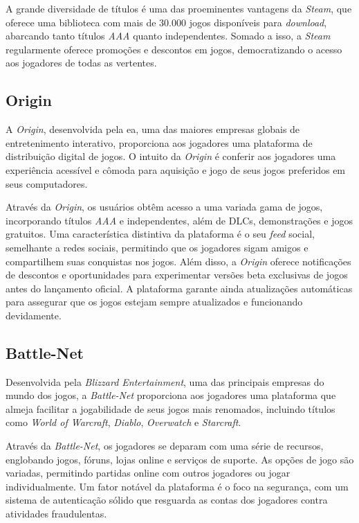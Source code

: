 A grande diversidade de títulos é uma das proeminentes vantagens da \textit{\gls{Steam}}, que oferece uma biblioteca com mais de 30.000 jogos disponíveis para \textit{download}, abarcando tanto títulos \textit{\gls{AAA}} quanto independentes. Somado a isso, a \textit{\gls{Steam}} regularmente oferece promoções e descontos em jogos, democratizando o acesso aos jogadores de todas as vertentes.

\subsection{Origin}

A \textit{\gls{Origin}}, desenvolvida pela \ac{ea}, uma das maiores empresas globais de entretenimento interativo, proporciona aos jogadores uma plataforma de distribuição digital de jogos. O intuito da \textit{\gls{Origin}} é conferir aos jogadores uma experiência acessível e cômoda para aquisição e jogo de seus jogos preferidos em seus computadores.

Através da \textit{\gls{Origin}}, os usuários obtêm acesso a uma variada gama de jogos, incorporando títulos \textit{\gls{AAA}} e independentes, além de DLCs, demonstrações e jogos gratuitos. Uma característica distintiva da plataforma é o seu \textit{feed} social, semelhante a redes sociais, permitindo que os jogadores sigam amigos e compartilhem suas conquistas nos jogos. Além disso, a \textit{\gls{Origin}} oferece notificações de descontos e oportunidades para experimentar versões beta exclusivas de jogos antes do lançamento oficial. A plataforma garante ainda atualizações automáticas para assegurar que os jogos estejam sempre atualizados e funcionando devidamente.

\subsection{Battle-Net}

Desenvolvida pela \textit{\gls{Blizzard} Entertainment}, uma das principais empresas do mundo dos jogos, a \textit{\gls{Battle-Net}} proporciona aos jogadores uma plataforma que almeja facilitar a jogabilidade de seus jogos mais renomados, incluindo títulos como \textit{World of Warcraft}, \textit{Diablo}, \textit{Overwatch} e \textit{Starcraft}.

Através da \textit{\gls{Battle-Net}}, os jogadores se deparam com uma série de recursos, englobando jogos, fóruns, lojas online e serviços de suporte. As opções de jogo são variadas, permitindo partidas online com outros jogadores ou jogar individualmente. Um fator notável da plataforma é o foco na segurança, com um sistema de autenticação sólido que resguarda as contas dos jogadores contra atividades fraudulentas.